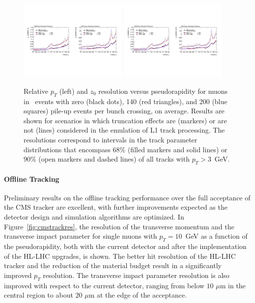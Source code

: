\begin{figure}[h!tbp]
\begin{center}
  \includegraphics[width=0.47\textwidth]{figures/cmsupgrade/TDR-17-001_fig6_8_a.pdf} \hfill
  \includegraphics[width=0.47\textwidth]{figures/cmsupgrade/TDR-17-001_fig6_8_b.pdf}
  \caption{ Relative $p_T$ (left) and $z_0$ resolution versus pseudorapidity for muons in \ttbar~events with zero (black dots), 140 (red triangles), and 200 (blue squares) pile-up events per bunch crossing, on average. Results are shown for scenarios in which truncation effects are (markers) or are not (lines) considered in the emulation of L1 track processing. The resolutions correspond to intervals in the track parameter distributions that encompass $68\%$ (filled markers and solid lines) or $90\%$ (open markers and dashed lines) of all tracks with $p_T > 3$~GeV.}
  \label{fig:cmsL1tracks}
\end{center}
\end{figure}

\paragraph{Offline Tracking}

Preliminary results on the offline tracking performance over the full acceptance of the CMS tracker are excellent, with further improvements expected as the detector design and simulation algorithms are optimized. In Figure~\ref{fig:cmstrackres}, the resolution of the transverse momentum and the transverse impact parameter for single muons with $p_T = 10$~GeV as a function of the pseudorapidity, both with the current detector and after the implementation of the HL-LHC upgrades, is shown. The better hit resolution of the HL-LHC tracker and the reduction of the material budget result in a significantly improved $p_T$ resolution. The transverse impact parameter resolution is also improved with respect to the current detector, ranging from below $10\,\,\mu\mathrm{m}$ %
in the central region to about $20\,\,\mu\mathrm{m}$ at the edge of the acceptance.

